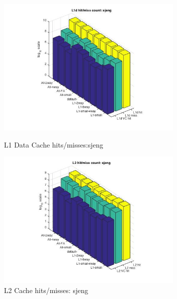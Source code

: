 \documentclass[11pt,titlepage]{article}
\begin{document}
          \begin{figure}[H]
          \centering   
          \begin{minipage}{.45\textwidth}
            \centering
            \includegraphics[width=9cm]{L1DHM_sjeng}
            \caption{L1 Data Cache hits/misses:sjeng}
            \label{fig:L1DHM_sjeng}
          \end{minipage}
          \begin{minipage}{.45\textwidth}
            \centering
            \includegraphics[width=9cm]{L2HM_sjeng}
            \caption{L2 Cache hits/misses: sjeng}
            \label{fig:L2HM_sjeng}
          \end{minipage}
	\end{figure}
\pagebreak
\end{document}
